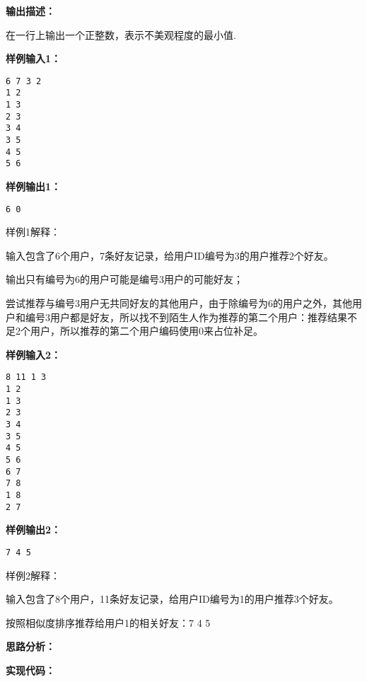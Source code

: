 \documentclass[a4paper]{ctexart}
\begin{document}
\noindent\textbf{输出描述：} 
	
在一行上输出一个正整数，表示不美观程度的最小值.
	
\noindent\textbf{样例输入1：}
	
\lstset{numbers=none}
\begin{lstlisting}
6 7 3 2
1 2
1 3
2 3
3 4
3 5
4 5
5 6
\end{lstlisting}
\lstset{numbers=left}
	
\noindent\textbf{样例输出1：}
\lstset{numbers=none}
\begin{lstlisting}
6 0
\end{lstlisting}
\lstset{numbers=left}

\noindent 样例1解释：

输入包含了6个用户，7条好友记录，给用户ID编号为3的用户推荐2个好友。

输出只有编号为6的用户可能是编号3用户的可能好友；

尝试推荐与编号3用户无共同好友的其他用户，由于除编号为6的用户之外，其他用户和编号3用户都是好友，所以找不到陌生人作为推荐的第二个用户：推荐结果不足2个用户，所以推荐的第二个用户编码使用0来占位补足。

\noindent\textbf{样例输入2：}

\lstset{numbers=none}
\begin{lstlisting}
8 11 1 3
1 2
1 3
2 3
3 4
3 5
4 5
5 6
6 7
7 8
1 8
2 7
\end{lstlisting}
\lstset{numbers=left}

\noindent\textbf{样例输出2：}
\lstset{numbers=none}
\begin{lstlisting}
7 4 5
\end{lstlisting}
\lstset{numbers=left}
	
\noindent 样例2解释：

输入包含了8个用户，11条好友记录，给用户ID编号为1的用户推荐3个好友。

按照相似度排序推荐给用户1的相关好友：7 4 5
	
\vspace{10pt}
	
\noindent\textbf{思路分析：}
	
\noindent\textbf{实现代码：}
	
\end{document}
